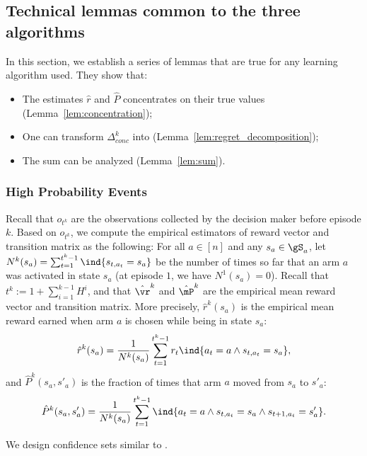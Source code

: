 \begin{subappendices}
\subsection{Technical lemmas common to the three algorithms}
\label{ssec:technical_lemmas}

In this section, we establish a series of lemmas that are true for any learning algorithm used. They show that:
\begin{itemize}
    \item The estimates $\hat{r}$ and $\hat{P}$ concentrates on their true values (Lemma~\ref{lem:concentration});
    \item One can transform $\Delta_{conc}^k$ into  (Lemma~\ref{lem:regret_decomposition});
    \item The sum  can be analyzed (Lemma~\ref{lem:sum}).
\end{itemize}

\subsubsection{High Probability Events}

Recall that $o_{t^k}$ are the observations collected by the decision maker before episode $k$. Based on $o_{t^k}$, we compute the empirical estimators of reward vector and transition matrix as the following: For all $a\in[n]$ and any $s_a\in\gS_a$, let $N^{k}(s_a)=\sum_{t=1}^{t^{k}-1}\ind{s_{t,a_t}=s_a}$ be the number of times so far that an arm $a$ was activated in state $s_a$ (at episode $1$, we have ${N^1(s_a)=0}$).
Recall that $t^{k}{:=} 1 {+}\sum_{i=1}^{k-1}H^i$, and that $\hat{\vr}^{k}$ and $\hat{\mP}^{k}$ are the empirical mean reward vector and transition matrix. More precisely, $\hat{r}^{k}(s_a)$ is the empirical mean reward earned when arm $a$ is chosen while being in state $s_a$:
\begin{align*}
    \hat{r}^{k}(s_a) = \frac{1}{N^{k}(s_a)}\sum_{t=1}^{t^{k}-1} r_t\ind{a_t=a \land s_{t,a_t}=s_a},
\end{align*}
and $\hat{P}^{k}(s_a,s'_a)$ is the fraction of times that arm $a$ moved from $s_a$ to $s'_a$:
\begin{align*}
    \hat{P}^{k}(s_a,s'_a) = \frac{1}{N^{k}(s_a)}\sum_{t=1}^{t^{k}-1} \ind{a_t=a \land s_{t,a_t}=s_a \land s_{t+1,a_t}=s'_a}.
\end{align*}

We design confidence sets similar to \cite{jaksch2010near,bartlett2012regal}.


\end{subappendices}
